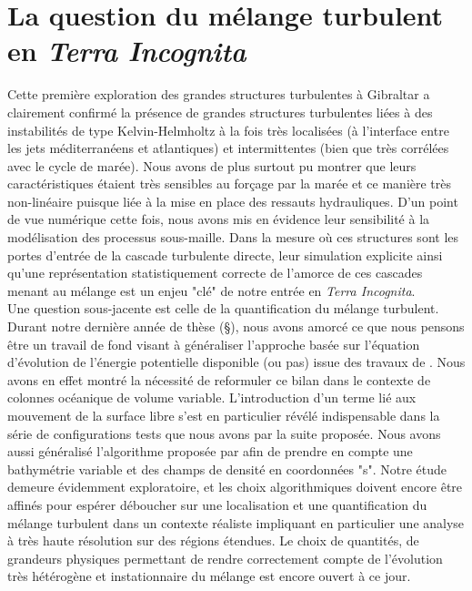 \section{La question du mélange turbulent en \textit{Terra Incognita}}
Cette première exploration des grandes structures turbulentes à Gibraltar a clairement confirmé la présence de grandes structures turbulentes liées à des instabilités de type Kelvin-Helmholtz à la fois très localisées (à l'interface entre les jets méditerranéens et atlantiques) et intermittentes (bien que très corrélées avec le cycle de marée). Nous avons de plus surtout pu montrer que leurs caractéristiques étaient très sensibles au forçage par la marée et ce manière très non-linéaire puisque liée à la mise en place des ressauts hydrauliques. D'un point de vue numérique cette fois, nous avons mis en évidence leur sensibilité à la modélisation des processus sous-maille.
\color{blue}
Dans la mesure où ces structures sont les portes d'entrée de la cascade turbulente directe, leur simulation explicite ainsi qu'une représentation statistiquement correcte  de l'amorce de ces cascades menant au mélange est un enjeu "clé" de notre entrée en \textit{Terra Incognita}.\\
\color{black}
Une question sous-jacente est celle de la quantification du mélange turbulent. Durant notre dernière année de thèse (\S {}), nous avons amorcé ce que nous pensons être un travail de fond visant à généraliser l'approche basée sur l'équation d'évolution de l'énergie potentielle disponible (ou pas) issue des travaux de \cite{lorenz_available_1955}. Nous avons en effet montré la nécessité de reformuler ce bilan dans le contexte de colonnes océanique de volume variable. L'introduction d'un terme lié aux mouvement de la surface libre s'est en particulier révélé indispensable dans la série de configurations tests que nous avons par la suite proposée. Nous avons aussi généralisé l'algorithme proposée par \cite{winters_available_1995} afin de prendre en compte une bathymétrie variable et des champs de densité en coordonnées "s". Notre étude demeure évidemment exploratoire, et les choix algorithmiques doivent encore être affinés pour espérer déboucher sur une localisation et une quantification du mélange turbulent dans un contexte réaliste impliquant en particulier une analyse à très haute résolution sur des régions étendues. Le choix de quantités, de grandeurs physiques permettant de rendre correctement compte de l'évolution très hétérogène et instationnaire du mélange est encore ouvert à ce jour.
